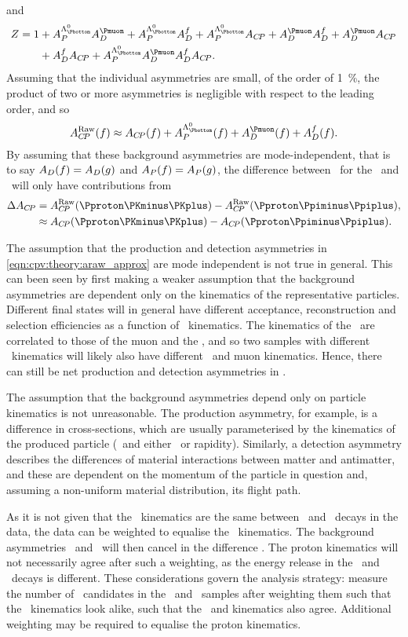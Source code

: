 and
\begin{align}
  Z = 1 &+ \APLb\ADmu + \APLb\ADf + \APLb\ACP + \ADmu\ADf + \ADmu\ACP \nonumber\\
        &+ \ADf\ACP + \APLb\ADmu\ADf\ACP.
\end{align}
Assuming that the individual asymmetries are small, of the order of 
\SI{1}{\percent}, the product of two or more asymmetries is negligible with 
respect to the leading order, and so
\begin{equation}
  \ARaw(f) \approx \ACP(f) + \APLb(f) + \ADmu(f) + \ADf(f).
  \label{eqn:cpv:theory:araw_approx}
\end{equation}
By assuming that these background asymmetries are mode-independent, that is to 
say $A_{D}(f) = A_{D}(g)$ and $A_{P}(f) = A_{P}(g)$, the difference between \ARaw\ for 
the \pKK\ and \ppipi\ will only have contributions from \ACP
\begin{align}
  \dACP &= \ARaw(\pKK) - \ARaw(\ppipi),\label{eqn:cpv:theory:dacp}\\
        &\approx \ACP(\pKK) - \ACP(\ppipi)\nonumber.
\end{align}

The assumption that the production and detection asymmetries in 
\cref{eqn:cpv:theory:araw_approx} are mode independent is not true in general.
This can been seen by first making a weaker assumption that the background 
asymmetries are dependent only on the kinematics of the representative 
particles.
Different final states will in general have different acceptance, 
reconstruction and selection efficiencies as a function of \PLambdac\ 
kinematics.
The kinematics of the \PLambdac\ are correlated to those of the muon and the 
\PLambdab, and so two samples with different \PLambdac\ kinematics will likely 
also have different \PLambdab\ and muon kinematics.
Hence, there can still be net production and detection asymmetries in \dACP\@.

The assumption that the background asymmetries depend only on particle 
kinematics is not unreasonable.
The production asymmetry, for example, is a difference in cross-sections, which 
are usually parameterised by the kinematics of the produced particle (\pT\ and 
either \Eta\ or rapidity).
Similarly, a detection asymmetry describes the differences of material 
interactions between matter and antimatter, and these are dependent on the 
momentum of the particle in question and, assuming a non-uniform material 
distribution, its flight path.

As it is not given that the \PLambdac\ kinematics are the same between 
\LcTopKK\ and \LcToppipi\ decays in the data, the data can be weighted to 
equalise the \PLambdac\ kinematics.
The background asymmetries \AP\ and \ADmu\ will then cancel in the difference 
\dACP\@.
The proton kinematics will not necessarily agree after such a weighting, as the 
energy release in the \pKK\ and \ppipi\ decays is different.
These considerations govern the analysis strategy: measure the number of 
\PLambdac\ candidates in the \pKK\ and \ppipi\ samples after weighting them 
such that the \PLambdac\ kinematics look alike, such that the \PLambdab\ and 
\Pmuon kinematics also agree.
Additional weighting may be required to equalise the proton kinematics.

